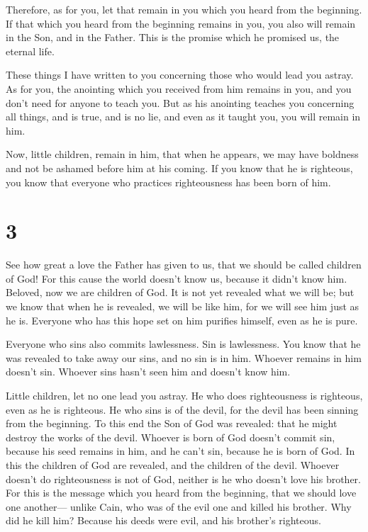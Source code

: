  Therefore, as for you, let that remain in you which you
heard from the beginning. If that which you heard from the beginning
remains in you, you also will remain in the Son, and in the Father.
 This is the promise which he promised us, the eternal
life.

 These things I have written to you concerning those who
would lead you astray.  As for you, the anointing which
you received from him remains in you, and you don't need for anyone to
teach you. But as his anointing teaches you concerning all things, and
is true, and is no lie, and even as it taught you, you will remain in
him.

 Now, little children, remain in him, that when he
appears, we may have boldness and not be ashamed before him at his
coming.  If you know that he is righteous, you know that
everyone who practices righteousness has been born of him.

\hypertarget{section-2}{%
\section{3}\label{section-2}}

 See how great a love the Father has given to us, that we
should be called children of God! For this cause the world doesn't know
us, because it didn't know him.  Beloved, now we are
children of God. It is not yet revealed what we will be; but we know
that when he is revealed, we will be like him, for we will see him just
as he is.  Everyone who has this hope set on him purifies
himself, even as he is pure.

 Everyone who sins also commits lawlessness. Sin is
lawlessness.  You know that he was revealed to take away
our sins, and no sin is in him.  Whoever remains in him
doesn't sin. Whoever sins hasn't seen him and doesn't know him.

 Little children, let no one lead you astray. He who does
righteousness is righteous, even as he is righteous.  He
who sins is of the devil, for the devil has been sinning from the
beginning. To this end the Son of God was revealed: that he might
destroy the works of the devil.  Whoever is born of God
doesn't commit sin, because his seed remains in him, and he can't sin,
because he is born of God.  In this the children of God
are revealed, and the children of the devil. Whoever doesn't do
righteousness is not of God, neither is he who doesn't love his brother.
 For this is the message which you heard from the
beginning, that we should love one another---  unlike
Cain, who was of the evil one and killed his brother. Why did he kill
him? Because his deeds were evil, and his brother's righteous.

